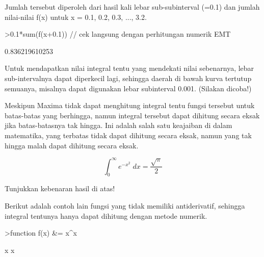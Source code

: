 \documentclass{article}
\begin{document}
\begin{eulernotebook}
\begin{eulercomment}
\begin{eulercomment}
\begin{eulercomment}
\begin{eulercomment}
\begin{eulercomment}
Jumlah tersebut diperoleh dari hasil kali lebar sub-subinterval (=0.1)
dan jumlah nilai-nilai f(x) untuk x = 0.1, 0.2, 0.3, ..., 3.2.
\end{eulercomment}
\begin{eulerprompt}
>0.1*sum(f(x+0.1)) // cek langsung dengan perhitungan numerik EMT
\end{eulerprompt}
\begin{euleroutput}
  0.836219610253
\end{euleroutput}
\begin{eulercomment}
Untuk mendapatkan nilai integral tentu yang mendekati nilai sebenarnya, lebar
sub-intervalnya dapat diperkecil lagi, sehingga daerah di bawah kurva tertutup
semuanya, misalnya dapat digunakan lebar subinterval 0.001. (Silakan dicoba!)

Meskipun Maxima tidak dapat menghitung integral tentu fungsi tersebut untuk
batas-batas yang berhingga, namun integral tersebut dapat dihitung secara eksak jika
batas-batasnya tak hingga. Ini adalah salah satu keajaiban di dalam matematika, yang
terbatas tidak dapat dihitung secara eksak, namun yang tak hingga malah dapat
dihitung secara eksak.
\end{eulercomment}
\begin{eulerformula}
\[
\int_{0}^{\infty }{e^ {- x^2 }\;dx}=\frac{\sqrt{\pi}}{2}
\]
\end{eulerformula}
\begin{eulercomment}
Tunjukkan kebenaran hasil di atas!

Berikut adalah contoh lain fungsi yang tidak memiliki antiderivatif, sehingga integral tentunya hanya
dapat dihitung dengan metode numerik.
\end{eulercomment}
\begin{eulerprompt}
>function f(x) &= x^x
\end{eulerprompt}
\begin{euleroutput}
  
                                     x
                                    x
  

\end{euleroutput}
\end{eulercomment}
\end{eulercomment}
\end{eulercomment}
\end{eulercomment}
\end{eulernotebook}
\end{document}
